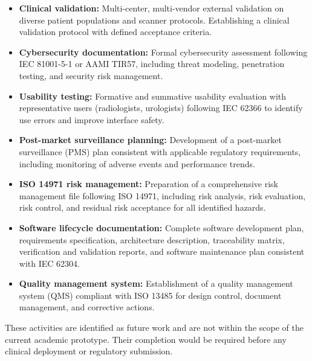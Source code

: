 \begin{itemize}
    \item \textbf{Clinical validation:} Multi-center, multi-vendor external validation on diverse patient populations and scanner protocols. Establishing a clinical validation protocol with defined acceptance criteria.
    \item \textbf{Cybersecurity documentation:} Formal cybersecurity assessment following IEC 81001-5-1 or AAMI TIR57, including threat modeling, penetration testing, and security risk management.
    \item \textbf{Usability testing:} Formative and summative usability evaluation with representative users (radiologists, urologists) following IEC 62366 to identify use errors and improve interface safety.
    \item \textbf{Post-market surveillance planning:} Development of a post-market surveillance (PMS) plan consistent with applicable regulatory requirements, including monitoring of adverse events and performance trends.
    \item \textbf{ISO 14971 risk management:} Preparation of a comprehensive risk management file following ISO 14971, including risk analysis, risk evaluation, risk control, and residual risk acceptance for all identified hazards.
    \item \textbf{Software lifecycle documentation:} Complete software development plan, requirements specification, architecture description, traceability matrix, verification and validation reports, and software maintenance plan consistent with IEC 62304.
    \item \textbf{Quality management system:} Establishment of a quality management system (QMS) compliant with ISO 13485 for design control, document management, and corrective actions.
\end{itemize}

These activities are identified as future work and are not within the scope of the current academic prototype. Their completion would be required before any clinical deployment or regulatory submission.

